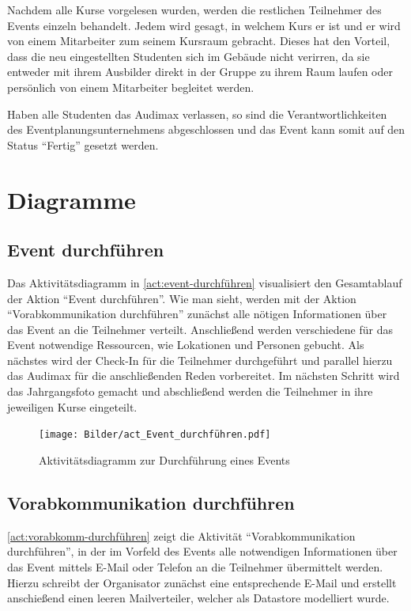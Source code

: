 Nachdem alle Kurse vorgelesen wurden, werden die restlichen Teilnehmer des Events einzeln behandelt. Jedem wird gesagt, in welchem Kurs er ist und er wird von einem Mitarbeiter zum seinem Kursraum gebracht. Dieses hat den Vorteil, dass die neu eingestellten Studenten sich im Gebäude nicht verirren, da sie entweder mit ihrem Ausbilder direkt in der Gruppe zu ihrem Raum laufen oder persönlich von einem Mitarbeiter begleitet werden.

Haben alle Studenten das Audimax verlassen, so sind die Verantwortlichkeiten des Eventplanungsunternehmens abgeschlossen und das Event kann somit auf den Status \enquote{Fertig} gesetzt werden.

\section{Diagramme}

\subsection{Event durchführen}
Das Aktivitätsdiagramm in \autoref{act:event-durchführen} visualisiert den Gesamtablauf der Aktion \enquote{Event durchführen}. Wie man sieht, werden mit der Aktion \enquote{Vorabkommunikation durchführen} zunächst alle nötigen Informationen über das Event an die Teilnehmer verteilt. Anschließend werden verschiedene für das Event notwendige Ressourcen, wie Lokationen und Personen gebucht. Als nächstes wird der Check-In für die Teilnehmer durchgeführt und parallel hierzu das Audimax für die anschließenden Reden vorbereitet. Im nächsten Schritt wird das Jahrgangsfoto gemacht und abschließend werden die Teilnehmer in ihre jeweiligen Kurse eingeteilt.
\begin{figure}[ht!]
    \centering
    \texttt{[image: Bilder/act\_Event\_durchführen.pdf]}
    \caption{Aktivitätsdiagramm zur Durchführung eines Events}
    \label{act:event-durchführen}
\end{figure}

\FloatBarrier

\subsection{Vorabkommunikation durchführen}
\autoref{act:vorabkomm-durchführen} zeigt die Aktivität \enquote{Vorabkommunikation durchführen}, in der im Vorfeld des Events alle notwendigen Informationen über das Event mittels E-Mail oder Telefon an die Teilnehmer übermittelt werden. Hierzu schreibt der Organisator zunächst eine entsprechende E-Mail und erstellt anschießend einen leeren Mailverteiler, welcher als Datastore modelliert wurde.

